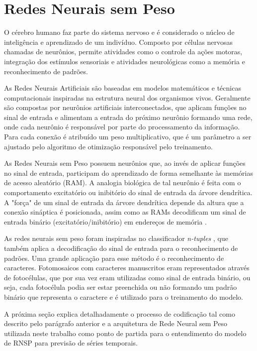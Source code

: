 \chapter{Redes Neurais sem Peso} \label{chap:03}
O cérebro humano faz parte do sistema nervoso e é considerado o núcleo de inteligência e aprendizado de um indivíduo. Composto por células nervosas chamadas de neurônios, permite atividades como o controle da ações motoras, integração dos estímulos sensoriais e atividades neurológicas como a memória e reconhecimento de padrões.

As Redes Neurais Artificiais são baseadas em modelos matemáticos e técnicas computacionais inspiradas na estrutura neural dos organismos vivos. Geralmente são compostas por neurônios artificiais interconectados, que aplicam funções no sinal de entrada e alimentam a entrada do próximo neurônio formando uma rede, onde cada neurônio é responsável por parte do processamento da informação. Para cada conexão é atribuído um peso multiplicativo, que é um parâmetro a ser ajustado pelo algoritmo de otimização responsável pelo treinamento.

As Redes Neurais sem Peso possuem neurônios que, ao invés de aplicar funções no sinal de entrada, participam do aprendizado de forma semelhante às memórias de acesso aleatório (RAM). A analogia biológica de tal neurônio é feita com o comportamento excitatório ou inibitório do sinal de entrada da árvore dendrítica. A "força" de um sinal de entrada da árvore dendrítica depende da altura que a conexão sináptica é posicionada, assim como as RAMs decodificam um sinal de entrada binário (excitatório/inibitório) em endereços de memória \cite{briefintrownn}.

As redes neurais sem peso foram inspiradas no classificador \textit{n-tuples} \cite{bledsoe&browning}, que também aplica a decodificação do sinal de entrada para o reconhecimento de padrões. Uma grande aplicação para esse método é o reconhecimento de caracteres. Fotomosaicos com caracteres manuscritos eram representados através de fotocélulas, que por sua vez eram utilizadas como sinal de entrada binário, ou seja, cada fotocélula podia ser estar preenchida ou não formando um padrão binário que representa o caractere e é utilizado para o treinamento do modelo.

A próxima seção explica detalhadamente o processo de codificação tal como descrito pelo parágrafo anterior e a arquitetura de Rede Neural sem Peso utilizada neste trabalho como ponto de partida para o entendimento do modelo de RNSP para previsão de séries temporais.

